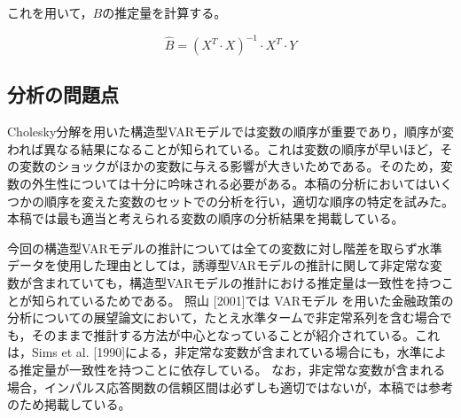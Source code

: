 \documentclass[12pt]{jarticle}
\begin{document}
{これを用いて，$B$の推定量を計算する。

\begin{equation}
  \label{eq7}
  \hat{B}=(X^T \cdot X)^{-1} \cdot X^T \cdot Y
\end{equation}






\newpage

\subsection{分析の問題点}

Cholesky分解を用いた構造型VARモデルでは変数の順序が重要であり，順序が変われば異なる結果になることが知られている。これは変数の順序が早いほど，その変数のショックがほかの変数に与える影響が大きいためである。そのため，変数の外生性については十分に吟味される必要がある。本稿の分析においてはいくつかの順序を変えた変数のセットでの分析を行い，適切な順序の特定を試みた。本稿では最も適当と考えられる変数の順序の分析結果を掲載している。

今回の構造型VARモデルの推計については全ての変数に対し階差を取らず水準データを使用した理由としては，誘導型VARモデルの推計に関して非定常な変数が含まれていても，構造型VARモデルの推計における推定量は一致性を持つことが知られているためである。
照山 [2001]では VARモデル を用いた金融政策の分析についての展望論文において，たとえ水準タームで非定常系列を含む場合でも，そのままで推計する方法が中心となっていることが紹介されている。これは，Sims et al. [1990]による，非定常な変数が含まれている場合にも，水準による推定量が一致性を持つことに依存している。
なお，非定常な変数が含まれる場合，インパルス応答関数の信頼区間は必ずしも適切ではないが，本稿では参考のため掲載している。

}
\end{document}
